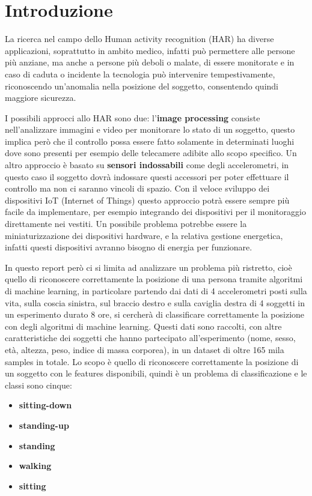 \section{Introduzione}\label{sec:introduzione}
La ricerca nel campo dello Human activity recognition (HAR) ha diverse applicazioni, soprattutto in ambito medico, infatti può permettere alle persone più anziane, ma anche a persone più deboli o malate, di essere monitorate e in caso di caduta o incidente la tecnologia può intervenire tempestivamente, riconoscendo un'anomalia nella posizione del soggetto, consentendo quindi maggiore sicurezza.  

I possibili approcci allo HAR sono due: l'\textbf{image processing} consiste nell'analizzare immagini e video per monitorare lo stato di un soggetto, questo implica però che il controllo possa essere fatto solamente in determinati luoghi dove sono presenti per esempio delle telecamere adibite allo scopo specifico. Un altro approccio è basato su \textbf{sensori indossabili} come degli accelerometri, in questo caso il soggetto dovrà indossare questi accessori per poter effettuare il controllo ma non ci saranno vincoli di spazio.  Con il veloce sviluppo dei dispositivi IoT (Internet of Things) questo approccio potrà essere sempre più facile da implementare, per esempio integrando dei dispositivi per il monitoraggio direttamente nei vestiti. Un possibile problema potrebbe essere la miniaturizzazione dei dispositivi hardware, e la relativa gestione energetica, infatti questi dispositivi avranno bisogno di energia per funzionare.

In questo report però ci si limita ad analizzare un problema più ristretto, cioè quello di riconoscere correttamente la posizione di una persona tramite algoritmi di machine learning, in particolare partendo dai dati di 4 accelerometri posti sulla vita, sulla coscia sinistra, sul braccio destro e sulla caviglia destra di 4 soggetti in un esperimento durato 8 ore, si cercherà di classificare correttamente la posizione con degli algoritmi di machine learning. Questi dati sono raccolti, con altre caratteristiche dei soggetti che hanno partecipato all'esperimento (nome, sesso, età, altezza, peso, indice di massa corporea), in un dataset di oltre 165 mila samples in totale. Lo scopo è quello di riconoscere correttamente la posizione di un soggetto con le features disponibili, quindi è un problema di classificazione e le classi sono cinque:
\begin{itemize}
\item \textbf{sitting-down}
\item \textbf{standing-up}
\item \textbf{standing}
\item \textbf{walking}
\item \textbf{sitting}
\end{itemize}

